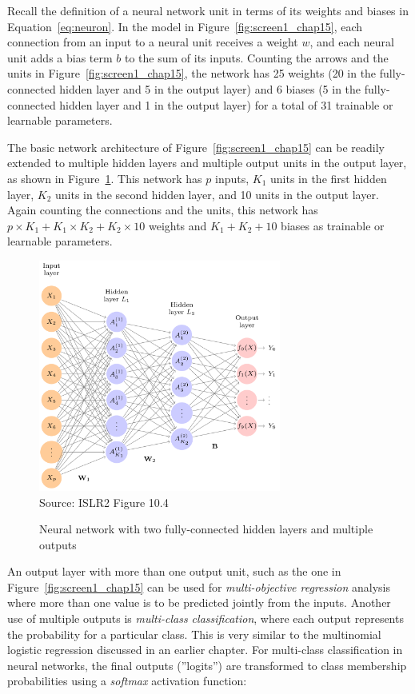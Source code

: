 Recall the definition of a neural network unit in terms of its weights and biases in Equation~\ref{eq:neuron}. In the model in Figure~\ref{fig:screen1_chap15}, each connection from an input to a neural unit receives a weight $w$, and each neural unit adds a bias term $b$ to the sum of its inputs. Counting the arrows and the units in Figure~\ref{fig:screen1_chap15}, the network has 25 weights (20 in the fully-connected hidden layer and 5 in the output layer) and 6 biases (5 in the fully-connected hidden layer and 1 in the output layer) for a total of 31 trainable or learnable parameters.

The basic network architecture of Figure~\ref{fig:screen1_chap15} can be readily extended to multiple hidden layers and multiple output units in the output layer, as shown in Figure~\ref{fig:screen2_chap15}. This network has $p$ inputs, $K_1$ units in the first hidden layer, $K_2$ units in the second hidden layer, and 10 units in the output layer. Again counting the connections and the units, this network has $p \times K_1 + K_1 \times K_2 + K_2 \times 10$ weights and $K_1 + K_2 + 10$ biases as trainable or learnable parameters. 


\begin{figure}
\centering
\includegraphics[height=3in]{screen2.png} \\

\scriptsize Source: ISLR2 Figure 10.4
\caption{Neural network with two fully-connected hidden layers and multiple outputs}
\label{fig:screen2_chap15}
\end{figure}

An output layer with more than one output unit, such as the one in Figure~\ref{fig:screen1_chap15} can be used for \emph{multi-objective regression} analysis where more than one value is to be predicted jointly from the inputs. Another use of multiple outputs is \emph{multi-class classification}, where each output represents the probability for a particular class. This is very similar to the multinomial logistic regression discussed in an earlier chapter. For multi-class classification in neural networks, the final outputs (''logits'') are transformed to class membership probabilities using a \emph{softmax} activation function:

